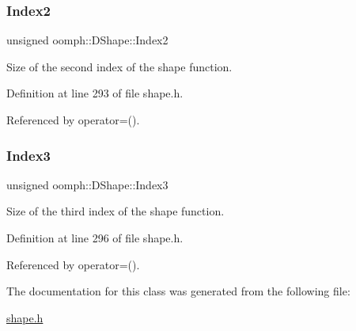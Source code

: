 \subsubsection{\texorpdfstring{Index2}{Index2}}
{\footnotesize\ttfamily unsigned oomph\+::\+D\+Shape\+::\+Index2\hspace{0.3cm}{\ttfamily [private]}}



Size of the second index of the shape function. 



Definition at line 293 of file shape.\+h.



Referenced by operator=().

\mbox{\label{classoomph_1_1DShape_a9745c10dc781a90f38333b0862c86f3f}} 
\subsubsection{\texorpdfstring{Index3}{Index3}}
{\footnotesize\ttfamily unsigned oomph\+::\+D\+Shape\+::\+Index3\hspace{0.3cm}{\ttfamily [private]}}



Size of the third index of the shape function. 



Definition at line 296 of file shape.\+h.



Referenced by operator=().



The documentation for this class was generated from the following file\+:\begin{DoxyCompactItemize}
\item 
\hyperlink{shape_8h}{shape.\+h}\end{DoxyCompactItemize}
